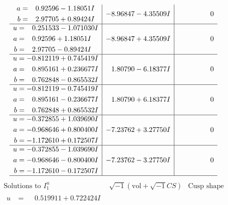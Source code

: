 \documentclass[1p]{elsarticle_modified}
\theoremstyle{definition}
\newcommand{\I}{\sqrt{-1}}
\begin{document}
$$\begin{array}{c|c|c}
\begin{aligned}
a &= \phantom{-}0.92596 - 1.18051 I \\
b &= \phantom{-}2.97705 + 0.89424 I\end{aligned}
 & -8.96847 - 4.35509 I & \phantom{-0.000000 } 0 \\ \hline\begin{aligned}
u &= \phantom{-}0.251533 - 1.071030 I \\
a &= \phantom{-}0.92596 + 1.18051 I \\
b &= \phantom{-}2.97705 - 0.89424 I\end{aligned}
 & -8.96847 + 4.35509 I & \phantom{-0.000000 } 0 \\ \hline\begin{aligned}
u &= -0.812119 + 0.745419 I \\
a &= \phantom{-}0.895161 + 0.236677 I \\
b &= \phantom{-}0.762848 - 0.865532 I\end{aligned}
 & \phantom{-}1.80790 - 6.18377 I & \phantom{-0.000000 } 0 \\ \hline\begin{aligned}
u &= -0.812119 - 0.745419 I \\
a &= \phantom{-}0.895161 - 0.236677 I \\
b &= \phantom{-}0.762848 + 0.865532 I\end{aligned}
 & \phantom{-}1.80790 + 6.18377 I & \phantom{-0.000000 } 0 \\ \hline\begin{aligned}
u &= -0.372855 + 1.039690 I \\
a &= -0.968646 + 0.800400 I \\
b &= -1.172610 + 0.172507 I\end{aligned}
 & -7.23762 + 3.27750 I & \phantom{-0.000000 } 0 \\ \hline\begin{aligned}
u &= -0.372855 - 1.039690 I \\
a &= -0.968646 - 0.800400 I \\
b &= -1.172610 - 0.172507 I\end{aligned}
 & -7.23762 - 3.27750 I & \phantom{-0.000000 } 0\\
 \hline 
 \end{array}$$\newpage$$\begin{array}{c|c|c}  
\text{Solutions to }I^u_{1}& \I (\text{vol} + \sqrt{-1}CS) & \text{Cusp shape}\\
 \hline 
\begin{aligned}
u &= \phantom{-}0.519911 + 0.722424 I \\

\end{aligned}
\end{array}$$
\end{document}
